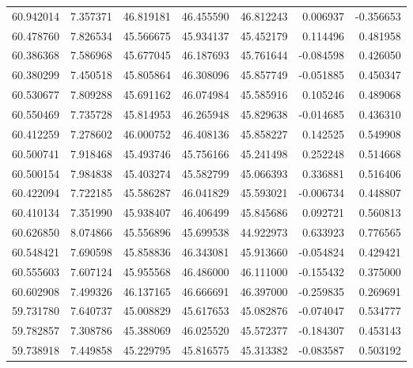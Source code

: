 \begin{tabular}{rrrrrrr}
 60.942014 &   7.357371 &         46.819181 &         46.455590 &         46.812243 &  0.006937 & -0.356653 \\
 60.478760 &   7.826534 &         45.566675 &         45.934137 &         45.452179 &  0.114496 &  0.481958 \\
 60.386368 &   7.586968 &         45.677045 &         46.187693 &         45.761644 & -0.084598 &  0.426050 \\
 60.380299 &   7.450518 &         45.805864 &         46.308096 &         45.857749 & -0.051885 &  0.450347 \\
 60.530677 &   7.809288 &         45.691162 &         46.074984 &         45.585916 &  0.105246 &  0.489068 \\
 60.550469 &   7.735728 &         45.814953 &         46.265948 &         45.829638 & -0.014685 &  0.436310 \\
 60.412259 &   7.278602 &         46.000752 &         46.408136 &         45.858227 &  0.142525 &  0.549908 \\
 60.500741 &   7.918468 &         45.493746 &         45.756166 &         45.241498 &  0.252248 &  0.514668 \\
 60.500154 &   7.984838 &         45.403274 &         45.582799 &         45.066393 &  0.336881 &  0.516406 \\
 60.422094 &   7.722185 &         45.586287 &         46.041829 &         45.593021 & -0.006734 &  0.448807 \\
 60.410134 &   7.351990 &         45.938407 &         46.406499 &         45.845686 &  0.092721 &  0.560813 \\
 60.626850 &   8.074866 &         45.556896 &         45.699538 &         44.922973 &  0.633923 &  0.776565 \\
 60.548421 &   7.690598 &         45.858836 &         46.343081 &         45.913660 & -0.054824 &  0.429421 \\
 60.555603 &   7.607124 &         45.955568 &         46.486000 &         46.111000 & -0.155432 &  0.375000 \\
 60.602908 &   7.499326 &         46.137165 &         46.666691 &         46.397000 & -0.259835 &  0.269691 \\
 59.731780 &   7.640737 &         45.008829 &         45.617653 &         45.082876 & -0.074047 &  0.534777 \\
 59.782857 &   7.308786 &         45.388069 &         46.025520 &         45.572377 & -0.184307 &  0.453143 \\
 59.738918 &   7.449858 &         45.229795 &         45.816575 &         45.313382 & -0.083587 &  0.503192 \\

\end{tabular}
